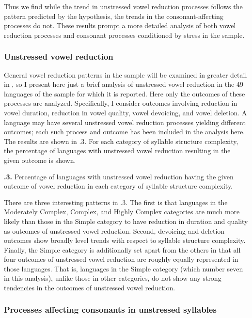   Thus we find while the trend in unstressed vowel reduction processes follows the pattern predicted by the hypothesis, the trends in the consonant-affecting processes do not. These results prompt a more detailed analysis of both vowel reduction processes and consonant processes conditioned by stress in the sample.

\subsubsection{{Unstressed} {vowel} {reduction}}\label{sec:5.4.3.1}

  General vowel reduction patterns in the sample will be examined in greater detail in , so I present here just a brief analysis of unstressed vowel reduction in the 49 languages of the sample for which it is reported. Here only the outcomes of these processes are analyzed. Specifically, I consider outcomes involving reduction in vowel duration, reduction in vowel quality, vowel devoicing, and vowel deletion. A language may have several unstressed vowel reduction processes yielding different outcomes; each such process and outcome has been included in the analysis here. The results are shown in .3. For each category of syllable structure complexity, the percentage of languages with unstressed vowel reduction resulting in the given outcome is shown.

\textbf{.3.} Percentage of languages with unstressed vowel reduction having the given outcome of vowel reduction in each category of syllable structure complexity.

  There are three interesting patterns in .3. The first is that languages in the  Moderately Complex, Complex, and Highly Complex categories are much more likely than those in the Simple category to have reduction in duration and quality as outcomes of unstressed vowel reduction. Second, devoicing and deletion outcomes show broadly level trends with respect to syllable structure complexity. Finally, the Simple category is additionally set apart from the others in that all four outcomes of unstressed vowel reduction are roughly equally represented in those languages. That is, languages in the Simple category (which number seven in this analysis), unlike those in other categories, do not show any strong tendencies in the outcomes of unstressed vowel reduction.

\subsubsection{{Processes} {affecting} {consonants} {in} {unstressed} {syllables}}\label{sec:5.4.3.2}

